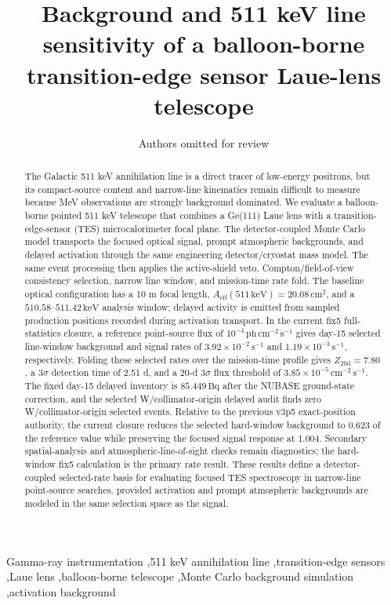 \documentclass[preprint,12pt]{elsarticle}
\newcommand{\keV}{\,\mathrm{keV}}
\newcommand{\cms}{\,\mathrm{cm^{-2}\,s^{-1}}}
\newcommand{\cps}{\,\mathrm{s^{-1}}}
\newcommand{\aeff}{A_{\mathrm{eff}}}
\begin{document}
\begin{frontmatter}

\title{Background and 511 keV line sensitivity of a balloon-borne transition-edge sensor Laue-lens telescope}

\author[inst1]{Authors omitted for review}
\address[inst1]{Affiliations omitted for review}

\begin{abstract}
The Galactic 511 keV annihilation line is a direct tracer of low-energy positrons, but its compact-source content and narrow-line kinematics remain difficult to measure because MeV observations are strongly background dominated. We evaluate a balloon-borne pointed 511 keV telescope that combines a Ge(111) Laue lens with a transition-edge-sensor (TES) microcalorimeter focal plane. The detector-coupled Monte Carlo model transports the focused optical signal, prompt atmospheric backgrounds, and delayed activation through the same engineering detector/cryostat mass model. The same event processing then applies the active-shield veto, Compton/field-of-view consistency selection, narrow line window, and mission-time rate fold. The baseline optical configuration has a 10 m focal length, $\aeff(511\keV)=20.08\,\mathrm{cm^2}$, and a $510.58$--$511.42\keV$ analysis window; delayed activity is emitted from sampled production positions recorded during activation transport. In the current fix5 full-statistics closure, a reference point-source flux of $10^{-4}\,\mathrm{ph\,cm^{-2}\,s^{-1}}$ gives day-15 selected line-window background and signal rates of $3.92\times10^{-2}\cps$ and $1.19\times10^{-3}\cps$, respectively. Folding these selected rates over the mission-time profile gives $Z_{20\mathrm{d}}=7.80$, a $3\sigma$ detection time of 2.51 d, and a 20-d $3\sigma$ flux threshold of $3.85\times10^{-5}\cms$. The fixed day-15 delayed inventory is $85.449\,\mathrm{Bq}$ after the NUBASE ground-state correction, and the selected W/collimator-origin delayed audit finds zero W/collimator-origin selected events. Relative to the previous v3p5 exact-position authority, the current closure reduces the selected hard-window background to 0.623 of the reference value while preserving the focused signal response at 1.004. Secondary spatial-analysis and atmospheric-line-of-sight checks remain diagnostics; the hard-window fix5 calculation is the primary rate result. These results define a detector-coupled selected-rate basis for evaluating focused TES spectroscopy in narrow-line point-source searches, provided activation and prompt atmospheric backgrounds are modeled in the same selection space as the signal.
\end{abstract}

\begin{keyword}
Gamma-ray instrumentation \sep 511 keV annihilation line \sep transition-edge sensors \sep Laue lens \sep balloon-borne telescope \sep Monte Carlo background simulation \sep activation background
\end{keyword}

\end{frontmatter}
\end{document}
